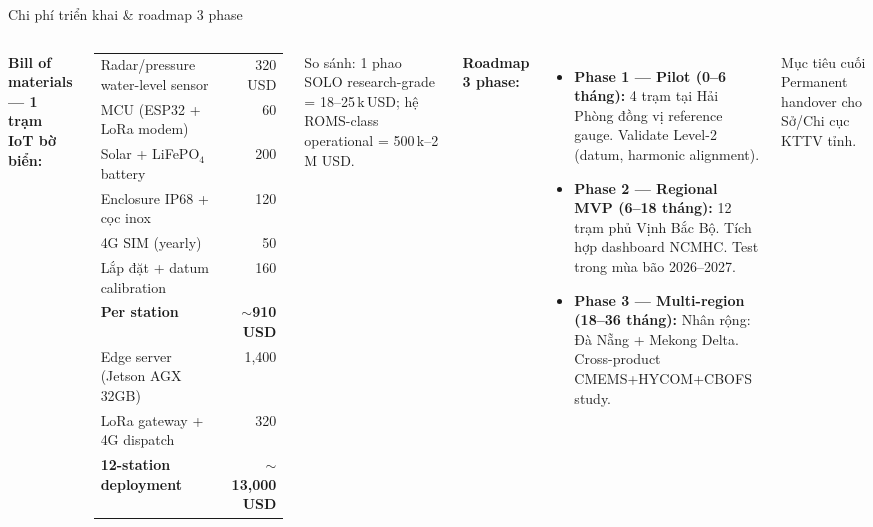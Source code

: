 \documentclass[11pt,aspectratio=169]{beamer}
\begin{document}
\begin{frame}{Chi phí triển khai \& roadmap 3 phase}
  \small
  \begin{columns}[T]
      \textbf{Bill of materials --- 1 trạm IoT bờ biển:}
      \scriptsize
      \begin{tabular}{@{}l r@{}}
        \toprule
        Radar/pressure water-level sensor & 320 USD \\
        MCU (ESP32 + LoRa modem)          & 60 \\
        Solar + LiFePO$_4$ battery        & 200 \\
        Enclosure IP68 + cọc inox         & 120 \\
        4G SIM (yearly)                   & 50 \\
        Lắp đặt + datum calibration       & 160 \\
        \midrule
        \textbf{Per station}              & \textbf{$\sim$910 USD} \\
        \midrule
        Edge server (Jetson AGX 32GB)     & 1{,}400 \\
        LoRa gateway + 4G dispatch        & 320 \\
        \midrule
        \textbf{12-station deployment}    & \alert{\textbf{$\sim$13{,}000 USD}} \\
        \bottomrule
      \end{tabular}

      \vspace{4pt}
      \small {\color{gray} So sánh: 1 phao SOLO research-grade = 18--25\,k\,USD; hệ ROMS-class operational = 500\,k--2\,M USD.}

      \textbf{Roadmap 3 phase:}
      \begin{itemize}\itemsep4pt
        \item \textbf{Phase 1 --- Pilot (0--6 tháng):}
        4 trạm tại Hải Phòng đồng vị reference gauge. Validate Level-2 (datum, harmonic alignment).

        \item \textbf{Phase 2 --- Regional MVP (6--18 tháng):}
        12 trạm phủ Vịnh Bắc Bộ. Tích hợp dashboard NCMHC. Test trong mùa bão 2026--2027.

        \item \textbf{Phase 3 --- Multi-region (18--36 tháng):}
        Nhân rộng: Đà Nẵng + Mekong Delta. Cross-product CMEMS+HYCOM+CBOFS study.
      \end{itemize}

      \vspace{4pt}
      \begin{block}{Mục tiêu cuối}
        Permanent handover cho Sở/Chi cục KTTV tỉnh.
      \end{block}
  \end{columns}
\end{frame}
\end{document}
